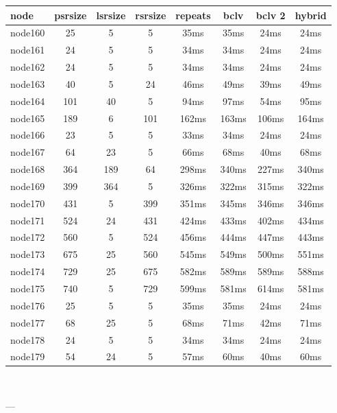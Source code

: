 \begin{tabular}{|l|c|c|c|c|c|c|c|}
\hline node & psrsize & lsrsize & rsrsize   & repeats & bclv & bclv 2 & hybrid\\
    \hline node160 & 25 & 5 & 5 & 35ms & 35ms & 24ms & 24ms\\
    \hline node161 & 24 & 5 & 5 & 34ms & 34ms & 24ms & 24ms\\
    \hline node162 & 24 & 5 & 5 & 34ms & 34ms & 24ms & 24ms\\
    \hline node163 & 40 & 5 & 24 & 46ms & 49ms & 39ms & 49ms\\
    \hline node164 & 101 & 40 & 5 & 94ms & 97ms & 54ms & 95ms\\
    \hline node165 & 189 & 6 & 101 & 162ms & 163ms & 106ms & 164ms\\
    \hline node166 & 23 & 5 & 5 & 33ms & 34ms & 24ms & 24ms\\
    \hline node167 & 64 & 23 & 5 & 66ms & 68ms & 40ms & 68ms\\
    \hline node168 & 364 & 189 & 64 & 298ms & 340ms & 227ms & 340ms\\
    \hline node169 & 399 & 364 & 5 & 326ms & 322ms & 315ms & 322ms\\
    \hline node170 & 431 & 5 & 399 & 351ms & 345ms & 346ms & 346ms\\
    \hline node171 & 524 & 24 & 431 & 424ms & 433ms & 402ms & 434ms\\
    \hline node172 & 560 & 5 & 524 & 456ms & 444ms & 447ms & 443ms\\
    \hline node173 & 675 & 25 & 560 & 545ms & 549ms & 500ms & 551ms\\
    \hline node174 & 729 & 25 & 675 & 582ms & 589ms & 589ms & 588ms\\
    \hline node175 & 740 & 5 & 729 & 599ms & 581ms & 614ms & 581ms\\
    \hline node176 & 25 & 5 & 5 & 35ms & 35ms & 24ms & 24ms\\
    \hline node177 & 68 & 25 & 5 & 68ms & 71ms & 42ms & 71ms\\
    \hline node178 & 24 & 5 & 5 & 34ms & 34ms & 24ms & 24ms\\
    \hline node179 & 54 & 24 & 5 & 57ms & 60ms & 40ms & 60ms\\

\hline
\end{tabular} \

---


